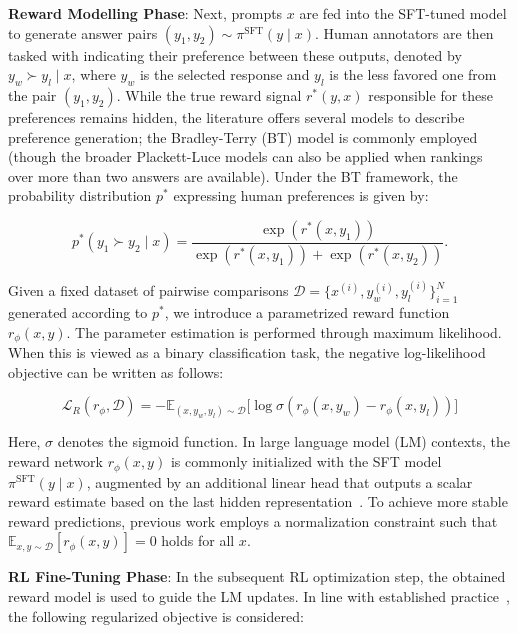 \textbf{Reward Modelling Phase}: Next, prompts $x$ are fed into the SFT-tuned model to generate answer pairs $(y_1, y_2)\sim \pi^\text{SFT}(y \mid x)$. Human annotators are then tasked with indicating their preference between these outputs, denoted by $y_w\succ y_l \mid x$, where $y_w$ is the selected response and $y_l$ is the less favored one from the pair $(y_1, y_2)$. While the true reward signal $r^*(y, x)$ responsible for these preferences remains hidden, the literature offers several models to describe preference generation; the Bradley-Terry (BT) \cite{bradley1952rankanalysis} model is commonly employed (though the broader Plackett-Luce models \citep{plackett1975analysis, luce2012individual} can also be applied when rankings over more than two answers are available). Under the BT framework, the probability distribution $p^*$ expressing human preferences is given by:

\begin{equation}\label{eq:bradley-terry}
    p^*(y_1\succ y_2 \mid x)=\frac{\exp\left(r^*(x, y_1)\right)}{\exp\left(r^*(x, y_1)\right) + \exp\left(r^*(x, y_2)\right)}.
\end{equation}

Given a fixed dataset of pairwise comparisons $\mathcal{D} = \bigl\{x^{(i)}, y_w^{(i)}, y_l^{(i)}\bigr\}_{i=1}^N$ generated according to $p^*$, we introduce a parametrized reward function $r_{\phi}(x, y)$. The parameter estimation is performed through maximum likelihood. When this is viewed as a binary classification task, the negative log-likelihood objective can be written as follows:

\begin{equation}\label{eq:reward_model}
    \mathcal{L}_R(r_{\phi}, \mathcal{D}) = -\mathbb{E}_{(x, y_w, y_l)\sim \mathcal{D}}\bigl[\log \sigma(r_{\phi}(x, y_w)- r_{\phi}(x, y_l))\bigr]
\end{equation}

Here, $\sigma$ denotes the sigmoid function. In large language model (LM) contexts, the reward network $r_{\phi}(x, y)$ is commonly initialized with the SFT model $\pi^\text{SFT}(y \mid x)$, augmented by an additional linear head that outputs a scalar reward estimate based on the last hidden representation~\cite{ziegler2020finetuning}. To achieve more stable reward predictions, previous work employs a normalization constraint such that $\mathbb{E}_{x,y\sim \mathcal{D}}\left[r_\phi(x, y)\right] = 0$ holds for all $x$.

\textbf{RL Fine-Tuning Phase}: In the subsequent RL optimization step, the obtained reward model is used to guide the LM updates. In line with established practice~\citep{jaques2017sequence, jaques2020human}, the following regularized objective is considered:

